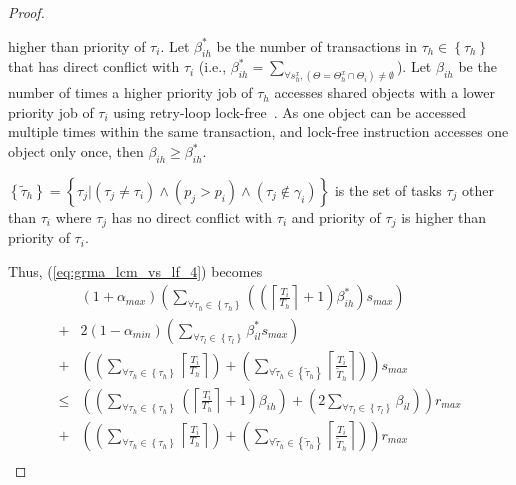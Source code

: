\begin{proof}
\begin{compactitem}
higher than priority of $\tau_{i}$. Let $\beta_{ih}^{*}$ be the
number of transactions in $\tau_{h}\in\left\{ \tau_{h}\right\} $
that has direct conflict with $\tau_{i}$ (i.e., $\beta_{ih}^{*}=\sum_{\forall s_{h}^{x},\left(\Theta=\Theta_{h}^{x}\cap\Theta_{i}\right)\neq\emptyset}$).
Let $\beta_{ih}$ be the number of times a higher priority job of
$\tau_{h}$ accesses shared objects with a lower priority job of $\tau_{i}$
using retry-loop lock-free~\cite{key-5}. As one object can be accessed
multiple times within the same transaction, and lock-free instruction
accesses one object only once, then $\beta_{ih}\ge\beta_{ih}^{*}$.
%
\item $\left\{ \tilde{\tau}_{h}\right\} =\left\{ \tau_{j}|\left(\tau_{j}\neq\tau_{i}\right)\wedge\left(p_{j}>p_{i}\right)\wedge\left(\tau_{j}\not\in\gamma_{i}\right)\right\} $
is the set of tasks $\tau_{j}$ other than $\tau_{i}$ where $\tau_{j}$
has no direct conflict with $\tau_{i}$ and priority of $\tau_{j}$
is higher than priority of $\tau_{i}$.
%
\end{compactitem}
%
Thus, (\ref{eq:grma_lcm_vs_lf_4}) becomes 
%
\begin{eqnarray}
 & \left(1+\alpha_{max}\right)\left(\sum_{\forall\tau_{h}\in\left\{ \tau_{h}\right\} }\left(\left(\left\lceil \frac{T_{i}}{T_{h}}\right\rceil +1\right)\beta_{ih}^{*}\right)s_{max}\right)\nonumber \\
+ & 2\left(1-\alpha_{min}\right)\left(\sum_{\forall\tau_{l}\in\left\{ \tau_{l}\right\} }\beta_{il}^{*}s_{max}\right)\nonumber \\
+ & \left(\left(\sum_{\forall\tau_{h}\in\left\{ \tau_{h}\right\} }\left\lceil \frac{T_{i}}{T_{h}}\right\rceil \right)+\left(\sum_{\forall\tilde{\tau}_{h}\in\left\{ \tilde{\tau}_{h}\right\} }\left\lceil \frac{T_{i}}{\tilde{T}_{h}}\right\rceil \right)\right)s_{max}\nonumber \\
\le & \left(\left(\sum_{\forall\tau_{h}\in\left\{ \tau_{h}\right\} }\left(\left\lceil \frac{T_{i}}{T_{h}}\right\rceil +1\right)\beta_{ih}\right)+\left(2\sum_{\forall\tau_{l}\in\left\{ \tau_{l}\right\} }\beta_{il}\right)\right)r_{max}\nonumber \\
+ & \left(\left(\sum_{\forall\tau_{h}\in\left\{ \tau_{h}\right\} }\left\lceil \frac{T_{i}}{T_{h}}\right\rceil \right)+\left(\sum_{\forall\tilde{\tau}_{h}\in\left\{ \tilde{\tau}_{h}\right\} }\left\lceil \frac{T_{i}}{\tilde{T}_{h}}\right\rceil \right)\right)r_{max}\label{eq:grma_lcm_vs_lf_5}
\end{eqnarray}
%
\begin{eqnarray}

\end{eqnarray}
\end{proof}
